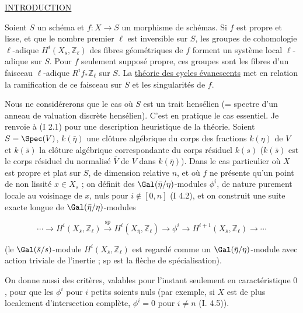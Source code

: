 
\thispagestyle{empty}
\begin{center}
\underline{INTRODUCTION}
\end{center}

Soient $S$ un schéma et $f:X\longrightarrow S$ un morphisme de schémas. Si $f$ est
propre et lisse, et que le nombre premier $\ell$ est inversible sur $S$, les groupes de
cohomologie $\ell$-adique $H^i(X_{\bar s},\mathbb Z_\ell)$ des fibres géométriques de $f$ forment un système
local $\ell$-adique sur $S$. Pour $f$ seulement supposé propre, ces groupes sont les fibres
d'un faisceau $\ell$-adique $R^i f_*\mathbb Z_\ell$ sur $S$. La \underline{théorie des cycles évanescents} met
en relation la ramification de ce faisceau sur $S$ et les singularités de $f$.

Nous ne considérerons que le cas où $S$ est un trait hensélien (= spectre d'un
anneau de valuation discrète hensélien). C'est en pratique le cas essentiel. Je renvoie
à (I 2.1) pour une description heuristique de la théorie. Soient $S=\Spec(V)$, $k(\bar\eta)$
une clôture algébrique du corps des fractions $k(\eta)$ de $V$ et $k(\bar s)$ la clôture algébrique
correspondante du corps résiduel $k(s)$ ($k(\bar s)$ est le corps résiduel du normalisé
$\bar V$ de $V$ dans $k(\bar\eta)$). Dans le cas particulier où $X$ est propre et plat sur
$S$, de dimension relative $n$, et où $f$ ne présente qu'un point de non lissité
$x\in X_s$ ; on définit des $\Gal(\bar\eta/\eta)$-modules $\phi^i$, de nature purement locale au voisinage
de $x$, nuls pour $i\notin[0,n]$ (I 4.2), et on construit une suite exacte longue
de $\Gal(\bar\eta/\eta)$-modules

\[
\cdots \longrightarrow H^i(X_{\bar s},\mathbb Z_\ell)
\xrightarrow{\mathrm{sp}} H^i(X_{\bar\eta},\mathbb Z_\ell)
\longrightarrow \phi^i
\longrightarrow H^{i+1}(X_{\bar s},\mathbb Z_\ell)
\longrightarrow \cdots
\]

(le $\Gal(\bar s/s)$-module $H^i(X_{\bar s},\mathbb Z_\ell)$ est regardé comme un
$\Gal(\bar\eta/\eta)$-module avec action triviale de l'inertie ; $\mathrm{sp}$ est la flèche de spécialisation).

On donne aussi des critères, valables pour l'instant seulement en caractéristique
$0$, pour que les $\phi^i$ pour $i$ petits soients nuls (par exemple, si $X$ est de plus
localement d'intersection complète, $\phi^i=0$ pour $i\ne n$ (I. 4.5)).

